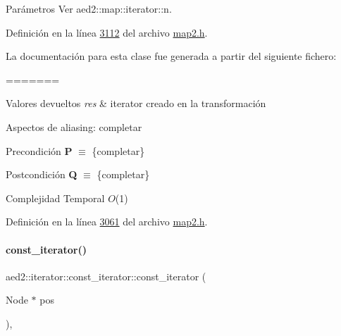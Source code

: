 \begin{DoxyParams}{\-Parámetros}
\-Ver aed2\-::map\-::iterator\-::n. 



\-Definición en la línea \hyperlink{map2_8h_source_l03112}{3112} del archivo \hyperlink{map2_8h_source}{map2.\-h}.



\-La documentación para esta clase fue generada a partir del siguiente fichero\-:\begin{DoxyCompactItemize}
=======
\begin{DoxyRetVals}{Valores devueltos}
{\em res} & iterator creado en la transformación\\
\hline
\end{DoxyRetVals}
\begin{DoxyParagraph}{Aspectos de aliasing\+:}
completar
\end{DoxyParagraph}
\begin{DoxyPrecond}{Precondición}
{\bfseries P} $\equiv$ \{completar\} 
\end{DoxyPrecond}
\begin{DoxyPostcond}{Postcondición}
{\bfseries Q} $\equiv$ \{completar\}
\end{DoxyPostcond}

\begin{DoxyDescription}
\item[Complejidad Temporal]$O$(1)
\end{DoxyDescription}

Definición en la línea \hyperlink{map2_8h_source_l03061}{3061} del archivo \hyperlink{map2_8h_source}{map2.\+h}.

\mbox{\label{classaed2_1_1iterator_1_1const__iterator_a8ef6d37dab4cd4ccad630fd0fa6cf28a_a8ef6d37dab4cd4ccad630fd0fa6cf28a}} 
\paragraph{\texorpdfstring{const\+\_\+iterator()}{const\_iterator()}\hspace{0.1cm}{\footnotesize\ttfamily [3/3]}}
{\footnotesize\ttfamily aed2\+::iterator\+::const\+\_\+iterator\+::const\+\_\+iterator (\begin{DoxyParamCaption}\item[{Node $\ast$}]{pos }\end{DoxyParamCaption})\hspace{0.3cm}{\ttfamily [inline]}, {\ttfamily [private]}}




\end{DoxyCompactItemize}
\end{DoxyParams}
